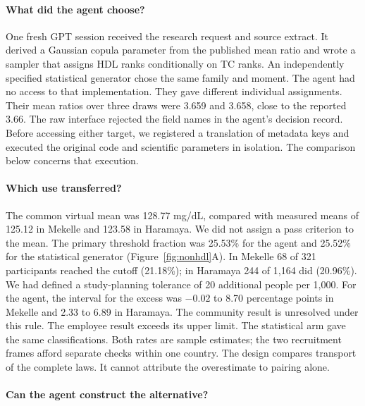 \paragraph{What did the agent choose?}
One fresh GPT session received the research request and source extract. It derived a Gaussian copula parameter from the published mean ratio and wrote a sampler that assigns HDL ranks conditionally on TC ranks. An independently specified statistical generator chose the same family and moment. The agent had no access to that implementation. They gave different individual assignments. Their mean ratios over three draws were 3.659 and 3.658, close to the reported 3.66. The raw interface rejected the field names in the agent's decision record. Before accessing either target, we registered a translation of metadata keys and executed the original code and scientific parameters in isolation. The comparison below concerns that execution.



\paragraph{Which use transferred?}
The common virtual mean was 128.77 mg/dL, compared with measured means of 125.12 in Mekelle and 123.58 in Haramaya. We did not assign a pass criterion to the mean. The primary threshold fraction was 25.53\% for the agent and 25.52\% for the statistical generator (Figure~\ref{fig:nonhdl}A). In Mekelle 68 of 321 participants reached the cutoff (21.18\%); in Haramaya 244 of 1,164 did (20.96\%). We had defined a study-planning tolerance of 20 additional people per 1,000. For the agent, the interval for the excess was $-0.02$ to 8.70 percentage points in Mekelle and 2.33 to 6.89 in Haramaya. The community result is unresolved under this rule. The employee result exceeds its upper limit. The statistical arm gave the same classifications. Both rates are sample estimates; the two recruitment frames afford separate checks within one country. The design compares transport of the complete laws. It cannot attribute the overestimate to pairing alone.

\paragraph{Can the agent construct the alternative?}


